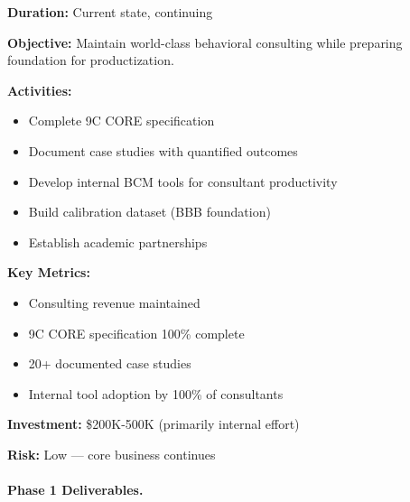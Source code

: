 \begin{tcolorbox}[colback=gray!5!white, colframe=gray!75!black,
    title=Phase 1: Consulting Excellence]

\textbf{Duration:} Current state, continuing

\textbf{Objective:}
Maintain world-class behavioral consulting while preparing foundation for productization.

\textbf{Activities:}
\begin{itemize}[nosep]
\item Complete 9C CORE specification
\item Document case studies with quantified outcomes
\item Develop internal BCM tools for consultant productivity
\item Build calibration dataset (BBB foundation)
\item Establish academic partnerships
\end{itemize}

\textbf{Key Metrics:}
\begin{itemize}[nosep]
\item Consulting revenue maintained
\item 9C CORE specification 100\% complete
\item 20+ documented case studies
\item Internal tool adoption by 100\% of consultants
\end{itemize}

\textbf{Investment:} \$200K-500K (primarily internal effort)

\textbf{Risk:} Low --- core business continues

\end{tcolorbox}

\paragraph{Phase 1 Deliverables.}

